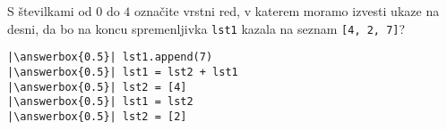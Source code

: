 \documentclass[arhiv, 10pt]{../izpit}
\newcommand{\inlinepy}[1]{\texttt{#1}}
\newcommand{\answerbox}[1]{\framebox{\vphantom{\large M}\hspace{#1cm}}}
\begin{document}
        \naloga*
        \begin{multicols}{2}
        \noindent 
        S številkami od $0$ do $4$ označite vrstni red, v katerem moramo izvesti ukaze na desni, da bo na koncu spremenljivka \inlinepy{lst1} kazala na seznam \inlinepy{[4, 2, 7]}?
    
        \columnbreak
        \noindent
        \begin{verbatim}
|\answerbox{0.5}| lst1.append(7)
|\answerbox{0.5}| lst1 = lst2 + lst1
|\answerbox{0.5}| lst2 = [4]
|\answerbox{0.5}| lst1 = lst2
|\answerbox{0.5}| lst2 = [2]

        \end{verbatim}
        \end{multicols}
    
\end{document}
